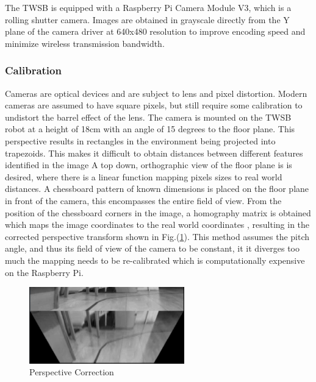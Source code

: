         The TWSB is equipped with a Raspberry Pi Camera Module V3, which is a rolling shutter camera. Images are obtained 
        in grayscale directly from the Y plane of the camera driver at 640x480 resolution to improve encoding speed and 
        minimize wireless transmission bandwidth.

        \subsubsection{Calibration}
        Cameras are optical devices and are subject to lens and pixel distortion. Modern cameras are assumed to have square pixels, 
        but still require some calibration to undistort the barrel effect of the lens. 
        The camera is mounted on the TWSB robot at a height of 18cm with an angle of 15 degrees to the floor plane.
        This perspective results in rectangles in the environment being projected into trapezoids.  This makes it difficult to 
        obtain distances between different features identified in the image \cite{tuohy2010distance}
        A top down, orthographic view of the floor plane is is desired, where there is a linear function mapping pixels sizes 
        to real world distances. A chessboard pattern of known dimensions is placed on the floor plane in front of the camera, 
        this encompasses the entire field of view. From the position of the chessboard corners in the image, 
        a homography matrix is obtained which maps the image coordinates to the real world coordinates \cite{bradski2008learning},
        resulting in the corrected perspective transform shown in Fig.(\ref{fig:perspective}). 
        This method assumes the pitch angle, and thus its field of view of the camera to be constant, it it diverges too much the 
        mapping needs to be re-calibrated which is computationally expensive on the Raspberry Pi.
        \begin{figure}[H]
            \centering
            \includegraphics[width=0.6\textwidth]{visionpipeline/perspective.png}
            \caption{Perspective Correction}
            \label{fig:perspective}
        \end{figure}

